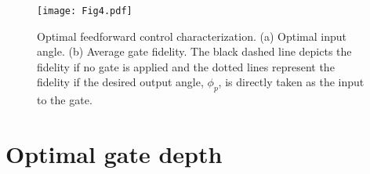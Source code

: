 \documentclass[prx,aps,twocolumn,showpacs,superscriptaddress,10pt]{revtex4-1}
\begin{document}
\begin{figure*}[t!]
	\centering
	\texttt{[image: Fig4.pdf]}
	\caption{Optimal feedforward control characterization. (a) Optimal input angle. (b) Average gate fidelity. The black dashed line depicts the fidelity if no gate is applied and the dotted lines represent the fidelity if the desired output angle, $\phi_{p}$, is directly taken as the input to the gate.}
	\label{fig:optimalFeedForward}
\end{figure*}

\section{Optimal gate depth}
\end{document}
